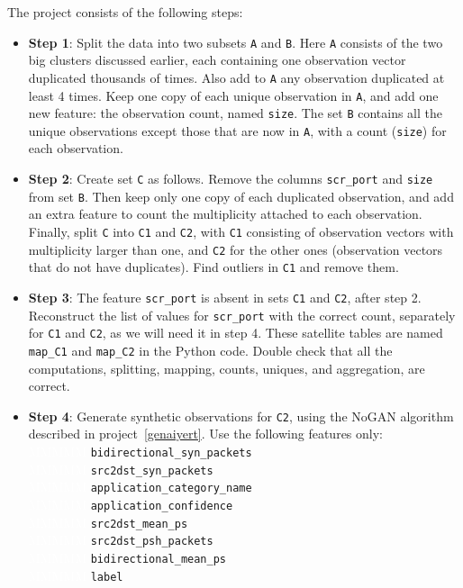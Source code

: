 \documentclass[oneside,10pt]{book}
\begin{document}
\noindent The project consists of the following steps: \vspace{1ex}
\begin{itemize}
\item[] {\bf Step 1}:  Split the data into two subsets \texttt{A} and \texttt{B}. Here \texttt{A} consists of the two big clusters discussed earlier, each containing one 
observation vector duplicated thousands of times. Also add to \texttt{A} any observation duplicated at least 4 times. Keep one copy of each unique observation in \texttt{A}, and add one new feature: the observation count, named \texttt{size}. The set \texttt{B} contains all the unique observations except those that are now in \texttt{A}, with a count (\texttt{size}) for each observation.\vspace{1ex}
\item[] {\bf Step 2}:  Create set \texttt{C} as follows. Remove the columns \texttt{scr\_port} and \texttt{size} from set \texttt{B}.
Then keep only one copy of each duplicated observation, and add an extra feature to count the multiplicity attached to each observation. 
Finally, split \texttt{C} into \texttt{C1} and \texttt{C2}, with \texttt{C1} consisting of observation vectors with multiplicity larger than one, and \texttt{C2} for the other ones (observation vectors that do not have duplicates). Find outliers in \texttt{C1} and remove them.
\vspace{1ex}
\item[] {\bf Step 3}: The feature \texttt{scr\_port} is absent in sets \texttt{C1} and \texttt{C2}, after step 2. 
 Reconstruct the list of values for \texttt{scr\_port} with the correct count, separately for \texttt{C1} and \texttt{C2}, as we will need it in step 4. These 
 satellite tables
 are named \texttt{map\_C1} and \texttt{map\_C2} in the Python code. Double check that all the computations, splitting, mapping, counts, uniques, and aggregation, are correct. \vspace{1ex}

\item[] {\bf Step 4}: Generate synthetic observations for \texttt{C2}, using the NoGAN algorithm described in project~\ref{genaiyert}.
Use the following features only: \vspace{1ex}\\
\textcolor{white}{MMMMM} \texttt{bidirectional\_syn\_packets}	\\
\textcolor{white}{MMMMM}  \texttt{src2dst\_syn\_packets}	\\
\textcolor{white}{MMMMM}  \texttt{application\_category\_name}	\\
\textcolor{white}{MMMMM}  \texttt{application\_confidence}\\
\textcolor{white}{MMMMM}  \texttt{src2dst\_mean\_ps}\\
\textcolor{white}{MMMMM}  \texttt{src2dst\_psh\_packets}\\
\textcolor{white}{MMMMM}  \texttt{bidirectional\_mean\_ps}\\	
\textcolor{white}{MMMMM}  \texttt{label}\vspace{1ex}


\end{itemize}
\end{document}
